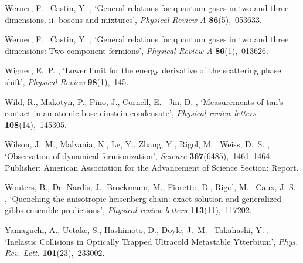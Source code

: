 \documentclass[onecolumn,amsfonts,showpacs,superscriptaddress]{revtex4-1}
\begin{document}
\begin{thebibliography}{xx}
Werner, F. \harvardand\ Castin, Y.  \harvardyearright , `General relations for quantum gases in two and three
  dimensions. ii. bosons and mixtures', {\em Physical Review A} {\bf
  86}(5),~053633.

Werner, F. \harvardand\ Castin, Y.  \harvardyearright , `General relations for quantum gases in two and three
  dimensions: Two-component fermions', {\em Physical Review A} {\bf
  86}(1),~013626.

Wigner, E.~P.  \harvardyearright , `Lower limit for the
  energy derivative of the scattering phase shift', {\em Physical Review} {\bf
  98}(1),~145.

Wild, R., Makotyn, P., Pino, J., Cornell, E. \harvardand\ Jin, D.
  \harvardyearleft 2012\harvardyearright , `Measurements of tan’s contact in
  an atomic bose-einstein condensate', {\em Physical review letters} {\bf
  108}(14),~145305.

Wilson, J.~M., Malvania, N., Le, Y., Zhang, Y., Rigol, M. \harvardand\ Weiss,
  D.~S.  \harvardyearleft 2020\harvardyearright , `Observation of dynamical
  fermionization', {\em Science} {\bf 367}(6485),~1461--1464.
\newblock Publisher: American Association for the Advancement of Science
  Section: Report.

Wouters, B., De~Nardis, J., Brockmann, M., Fioretto, D., Rigol, M. \harvardand\
  Caux, J.-S.  \harvardyearright , `Quenching the
  anisotropic heisenberg chain: exact solution and generalized gibbs ensemble
  predictions', {\em Physical review letters} {\bf 113}(11),~117202.

Yamaguchi, A., Uetake, S., Hashimoto, D., Doyle, J.~M. \harvardand\ Takahashi,
  Y.  \harvardyearright , `Inelastic {Collisions} in
  {Optically} {Trapped} {Ultracold} {Metastable} {Ytterbium}', {\em Phys. Rev.
  Lett.} {\bf 101}(23),~233002.


\end{thebibliography}
\end{document}
